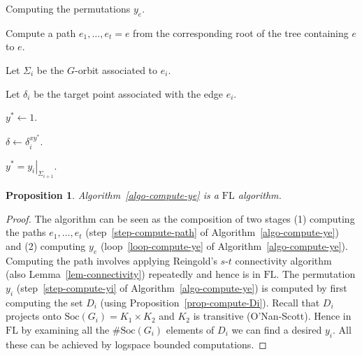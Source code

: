 \documentclass[11pt]{madras}%
\newtheorem{proposition}[theorem]{Proposition}
\theoremstyle{remark}
\newcommand{\pr}[2]{{\ensuremath{\left.{#1}\right\vert_{#2}}}}
\newcommand{\Soc}[1]{{\ensuremath{\mathrm{Soc}\left(#1\right)}}}
\begin{document}
\begin{algorithm}[h]
  \caption{Computing the permutations $y_e$.}\label{algo-compute-ye}


   Compute a path $e_1, \ldots, e_t = e$ from
  the corresponding root of the tree containing $e$ to $e$.
  
  Let $\Sigma_i$ be the $G$-orbit associated to $e_i$.

  Let $\delta_i$ be the target point associated with the edge $e_i$.
 
  $y^* \leftarrow 1$.

   {
    
    $\delta \leftarrow \delta_{i}^{xy^*}$.

      
   

    
     {$y^* = \pr{y_i}{\Sigma_{i+1}}$.}%
    
  }

\end{algorithm}

\begin{proposition}
  Algorithm~\ref{algo-compute-ye} is a $\mathrm{FL}$ algorithm.
\end{proposition}
\begin{proof}
  The algorithm can be seen as the composition of two stages (1)
  computing the paths $e_1,\ldots,e_t$ (step~\ref{step-compute-path}
  of Algorithm~\ref{algo-compute-ye}) and (2) computing $y_e$
  (loop~\ref{loop-compute-ye} of Algorithm~\ref{algo-compute-ye}).
  Computing the path involves applying Reingold's $s$-$t$ connectivity
  algorithm~\cite{reingold2005undirected} (also
  Lemma~\ref{lem-connectivity}) repeatedly and hence is in
  $\mathrm{FL}$. The permutation $y_i$ (step~\ref{step-compute-yi} of
  Algorithm~\ref{algo-compute-ye}) is computed by first computing the
  set $D_i$ (using Proposition~\ref{prop-compute-Di}). Recall that
  $D_i$ projects onto $\Soc{G_i} = K_1 \times K_2$ and $K_2$ is
  transitive (O'Nan-Scott).  Hence in $\mathrm{FL}$ by examining all
  the $\# \Soc{G_i}$ elements of $D_i$ we can find a desired $y_i$.
  All these can be achieved by logspace bounded computations.
\end{proof}
\end{document}
